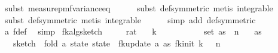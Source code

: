 \begin{isabellebody}
\ {\isacharparenleft}{\kern0pt}subst\ measure{\isacharunderscore}{\kern0pt}pmf{\isachardot}{\kern0pt}variance{\isacharunderscore}{\kern0pt}eq{\isacharparenright}{\kern0pt}\isanewline
\ \ \ \ \isamarkupfalse%
\ {\isacharparenleft}{\kern0pt}subst\ {\isasymOmega}{\isacharunderscore}{\kern0pt}def{\isacharbrackleft}{\kern0pt}symmetric{\isacharbrackright}{\kern0pt}{\isacharcomma}{\kern0pt}\ metis\ integrable{\isacharparenright}{\kern0pt}\isanewline
\ \ \ \ \isamarkupfalse%
\ {\isacharparenleft}{\kern0pt}subst\ {\isasymOmega}{\isacharunderscore}{\kern0pt}def{\isacharbrackleft}{\kern0pt}symmetric{\isacharbrackright}{\kern0pt}{\isacharcomma}{\kern0pt}\ metis\ integrable{\isacharparenright}{\kern0pt}\isanewline
\ \ \ \ \isamarkupfalse%
\ {\isacharparenleft}{\kern0pt}simp\ add{\isacharcolon}{\kern0pt}\ {\isasymOmega}{\isacharunderscore}{\kern0pt}def{\isacharbrackleft}{\kern0pt}symmetric{\isacharbrackright}{\kern0pt}{\isacharparenright}{\kern0pt}\isanewline
\ \ \ \ \isamarkupfalse%
\ a\ f{\isacharunderscore}{\kern0pt}def\ \isamarkupfalse%
\ simp\isanewline
{}\isamarkupfalse%
%
\endisatagproof
{\isafoldproof}%
%
\isadelimproof
\isanewline
%
\endisadelimproof
\isanewline
{}\isamarkupfalse%
\ fk{\isacharunderscore}{\kern0pt}alg{\isacharunderscore}{\kern0pt}sketch{\isacharcolon}{\kern0pt}\isanewline
\ \ \ {\isasymepsilon}\ {\isacharcolon}{\kern0pt}{\isacharcolon}{\kern0pt}\ rat\isanewline
\ \ \ {\isachardoublequoteopen}k\ {\isasymge}\ {}{\isachardoublequoteclose}\isanewline
\ \ \ {\isachardoublequoteopen}{\isasymdelta}\ {\isachargreater}{\kern0pt}\ {}{\isachardoublequoteclose}\isanewline
\ \ \ {\isachardoublequoteopen}set\ as\ {\isasymsubseteq}\ {\isacharbraceleft}{\kern0pt}{}{\isachardot}{\kern0pt}{\isachardot}{\kern0pt}{\isacharless}{\kern0pt}n{\isacharbraceright}{\kern0pt}{\isachardoublequoteclose}\isanewline
\ \ \ {\isachardoublequoteopen}as\ {\isasymnoteq}\ {\isacharbrackleft}{\kern0pt}{\isacharbrackright}{\kern0pt}{\isachardoublequoteclose}\isanewline
\ \ \ {\isachardoublequoteopen}sketch\ {\isasymequiv}\ fold\ {\isacharparenleft}{\kern0pt}{\isasymlambda}a\ state{\isachardot}{\kern0pt}\ state\ {\isasymbind}\ fk{\isacharunderscore}{\kern0pt}update\ a{\isacharparenright}{\kern0pt}\ as\ {\isacharparenleft}{\kern0pt}fk{\isacharunderscore}{\kern0pt}init\ k\ {\isasymdelta}\ {\isasymepsilon}\ n{\isacharparenright}{\kern0pt}{\isachardoublequoteclose}\isanewline

\end{isabellebody}
